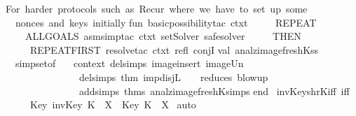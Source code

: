 \begin{isabellebody}
  \isanewline
  {\isacharparenleft}{\isacharasterisk}For\ harder\ protocols\ {\isacharparenleft}such\ as\ Recur{\isacharparenright}\ where\ we\ have\ to\ set\ up\ some\isanewline
  \ \ nonces\ and\ keys\ initially{\isacharasterisk}{\isacharparenright}\isanewline
  fun\ basic{\isacharunderscore}possibility{\isacharunderscore}tac\ ctxt\ {\isacharequal}\isanewline
  \ \ \ \ REPEAT\ \isanewline
  \ \ \ \ {\isacharparenleft}ALLGOALS\ {\isacharparenleft}asm{\isacharunderscore}simp{\isacharunderscore}tac\ {\isacharparenleft}ctxt\ setSolver\ safe{\isacharunderscore}solver{\isacharparenright}{\isacharparenright}\isanewline
  \ \ \ \ \ THEN\isanewline
  \ \ \ \ \ REPEAT{\isacharunderscore}FIRST\ {\isacharparenleft}resolve{\isacharunderscore}tac\ ctxt\ {\isacharbrackleft}refl{\isacharcomma}\ conjI{\isacharbrackright}{\isacharparenright}{\isacharparenright}\isanewline
  \isanewline
  val\ analz{\isacharunderscore}image{\isacharunderscore}freshK{\isacharunderscore}ss\ {\isacharequal}\ \isanewline
  \ \ simpset{\isacharunderscore}of\isanewline
  \ \ \ {\isacharparenleft}{\isacharat}{\isacharbraceleft}context{\isacharbraceright}\ delsimps\ {\isacharbrackleft}image{\isacharunderscore}insert{\isacharcomma}\ image{\isacharunderscore}Un{\isacharbrackright}\isanewline
  \ \ \ \ \ \ \ \ \ \ \ \ \ \ \ delsimps\ {\isacharbrackleft}{\isacharat}{\isacharbraceleft}thm\ imp{\isacharunderscore}disjL{\isacharbraceright}{\isacharbrackright}\ \ \ \ {\isacharparenleft}{\isacharasterisk}reduces\ blow{\isacharminus}up{\isacharasterisk}{\isacharparenright}\isanewline
  \ \ \ \ \ \ \ \ \ \ \ \ \ \ \ addsimps\ {\isacharat}{\isacharbraceleft}thms\ analz{\isacharunderscore}image{\isacharunderscore}freshK{\isacharunderscore}simps{\isacharbraceright}{\isacharparenright}\isanewline
  end\isanewline
  {\isacartoucheclose}%
  \endisatagML
  {\isafoldML}%
  \isadelimML
  \isanewline
  \endisadelimML
  \isanewline
  \isanewline
  \isamarkupfalse%
  \ invKey{\isacharunderscore}shrK{\isacharunderscore}iff\ {\isacharbrackleft}iff{\isacharbrackright}{\isacharcolon}\isanewline
  \ \ \ \ \ {\isachardoublequoteopen}{\isacharparenleft}Key\ {\isacharparenleft}invKey\ K{\isacharparenright}\ {\isasymin}\ X{\isacharparenright}\ {\isacharequal}\ {\isacharparenleft}Key\ K\ {\isasymin}\ X{\isacharparenright}{\isachardoublequoteclose}\isanewline
  \isadelimproof
  \endisadelimproof
  \isatagproof
  \isamarkupfalse%
  \ auto%
  \endisatagproof
  {\isafoldproof}%
  \isadelimproof
  \isanewline
  \endisadelimproof
  \isanewline
  \isadelimML
  \isanewline

\end{isabellebody}
